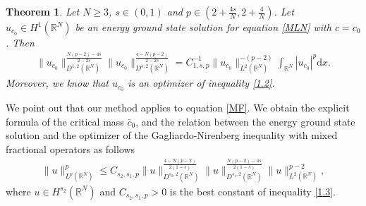 \documentclass[12pt,a4paper,reqno]{amsart}
\numberwithin{equation}{section}
\newtheorem{theorem}{Theorem}[section]
\begin{document}
\begin{theorem}\label{Theorem1.5}
Let $N\geqslant3$,
$s\in(0,1)$
and  $p\in(2+\frac{4s}{N},2+\frac{4}{N})$.
Let $u_{c_{0}}\in H^{1}(\mathbb{R}^{N})$ be an energy ground state solution for equation \eqref{MLN} with $c=c_{0}$.
Then
\begin{equation*}
\begin{aligned}
\|u_{c_{0}}\|_{D^{1,2}(\mathbb{R}^{N})}^{\frac{N(p-2)-4s}{2-2s}}
\|u_{c_{0}}\|_{D^{s,2}(\mathbb{R}^{N})}^{\frac{4-N(p-2)}{2-2s}}
=C_{1,s,p}^{-1}\|u_{c_{0}}\|_{L^{2}(\mathbb{R}^{N})}^{-(p-2)}
\int_{\mathbb{R}^{N}}
|u_{c_{0}}|^{p}
\mathrm{d}x.
\end{aligned}
\end{equation*}
Moreover,
we know that $u_{c_{0}}$ is an optimizer of inequality \eqref{1.2}.
\end{theorem}


We point out that our method applies to equation \eqref{MF}.
We obtain the explicit formula of the critical mass $\bar{c}_{0}$,
and the relation between the energy ground state solution and the optimizer of the Gagliardo-Nirenberg inequality with mixed fractional operators as follows
\begin{equation}\label{1.3}
\begin{aligned}
\|u\|_{L^{p}(\mathbb{R}^{N})}^{p}
\leqslant C_{s_{2},s_{1},p}
\|u\|_{D^{s_{2},2}(\mathbb{R}^{N})}^{\frac{4-N(p-2)}{2(1-s)}}
\|u\|_{D^{s_{1},2}(\mathbb{R}^{N})}^{\frac{N(p-2)-4s}{2(1-s)}}
\|u\|_{L^{2}(\mathbb{R}^{N})}^{p-2},
\end{aligned}
\end{equation}
where $u\in H^{s_{2}}(\mathbb{R}^{N})$
and $C_{s_{2},s_{1},p}>0$ is the best constant of inequality \eqref{1.3}.
\end{document}
